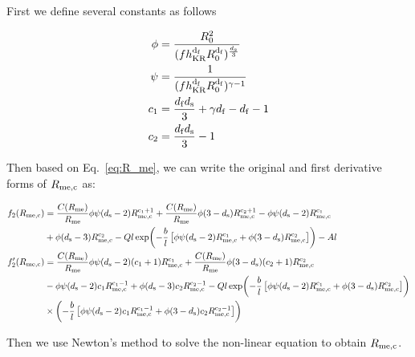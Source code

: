 \documentclass{article}
\begin{document}
\begin{itemize}
First we define several constants as follows

\begin{align}
  \phi &= \frac{R_0^{2}}{(f h_{\rm KR}^{\rm d_{\rm f}} R_0^{\rm d_{\rm f}})^{\frac{d_{\rm s}}{3}}} \\
  \psi &= \frac{1}{(f h_{\rm KR}^{\rm d_{\rm f}} R_0^{\rm d_{\rm f}})^{\gamma - 1}} \\
  c_1 &= \frac{d_{\rm f} d_{\rm s}}{3} + \gamma d_{\rm f} - d_{\rm f} - 1 \\
  c_2 &= \frac{d_{\rm f} d_{\rm s}}{3} - 1
\end{align}

Then based on Eq.~\ref{eq:R_me}, we can write the original and first derivative forms of $R_{\rm me,c}$ as:

\begin{align}
  f_2(R_{\rm me,c}) &= \frac{C(R_{\rm me})}{R_{\rm me}} \phi \psi (d_{\rm s} -2) R_{\rm me,c}^{\rm c_1+1} + \frac{C(R_{\rm me})}{R_{\rm me}} \phi (3-d_{\rm s}) R_{\rm me,c}^{\rm c_2+1} - \phi \psi (d_{\rm s}-2) R_{\rm me,c}^{\rm c_1} \notag \\
  &+ \phi (d_{\rm s} -3) R_{\rm me,c}^{\rm c_2} - Q l \exp\biggl(- \frac{b}{l} \left[\phi \psi (d_{\rm s}-2) R_{\rm me,c}^{\rm c_1} + \phi (3-d_{\rm s}) R_{\rm me,c}^{\rm c_2}\right]\biggr) - A l \\
   f_2^ \prime (R_{\rm me,c}) &= \frac{C(R_{\rm me})}{R_{\rm me}} \phi \psi (d_{\rm s} -2) (c_1 +1) R_{\rm me,c}^{\rm c_1} + \frac{C(R_{\rm me})}{R_{\rm me}} \phi (3-d_{\rm s}) (c_2+1) R_{\rm me,c}^{\rm c_2} \notag \\
   &- \phi \psi (d_{\rm s}-2) c_1 R_{\rm me,c}^{\rm c_1-1} + \phi (d_{\rm s} -3) c_2 R_{\rm me,c}^{\rm c_2-1} \notag - Q l \exp\biggl(- \frac{b}{l} \left[\phi \psi (d_{\rm s}-2) R_{\rm me,c}^{\rm c_1} + \phi (3-d_{\rm s}) R_{\rm me,c}^{\rm c_2} \right]\biggr) \notag \\
   & \times \biggl(- \frac{b}{l} \left[\phi \psi (d_{\rm s}-2) c_1 R_{\rm me,c}^{\rm c_1-1} + \phi (3-d_{\rm s}) c_2 R_{\rm me,c}^{\rm c_2-1}\right]\biggr)
\end{align}

Then we use Newton's method to solve the non-linear equation to obtain $R_{\rm me,c}$.

\end{itemize}
\end{document}

